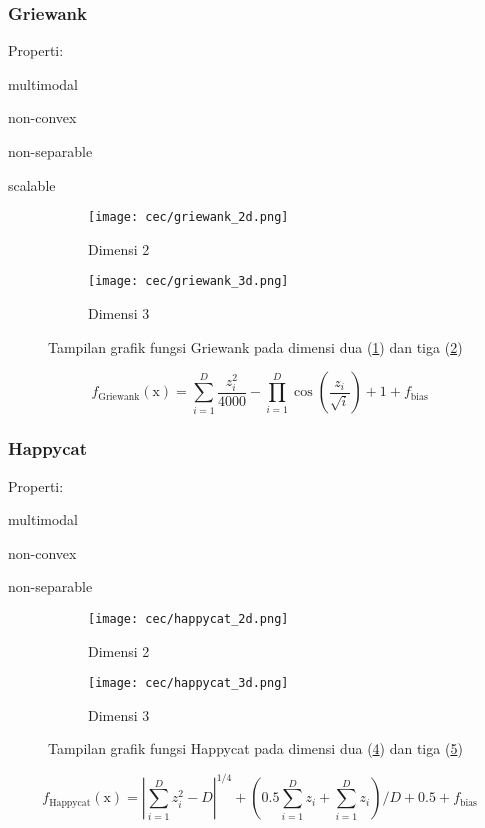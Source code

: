 \subsubsection*{Griewank}
\noindent Properti:
\begin{packed_item}
  \item multimodal
  \item non-convex
  \item non-separable
  \item scalable
\end{packed_item}
\begin{figure}[H]
	\centering
	\begin{subfigure}[b]{0.4\textwidth}
		\centering
		\texttt{[image: cec/griewank\_2d.png]}
		\caption{Dimensi 2}
		\label{fig:griewank-2d}
	\end{subfigure}
	\hfill
	\begin{subfigure}[b]{0.4\textwidth}
		\centering
		\texttt{[image: cec/griewank\_3d.png]}
		\caption{Dimensi 3}
		\label{fig:griewank-3d}
	\end{subfigure}
	\caption{Tampilan grafik fungsi Griewank pada dimensi dua (\cref{fig:griewank-2d}) dan tiga (\cref{fig:griewank-3d})}
	\label{fig:griewank}
\end{figure}
\begin{equation}
  f_{\text{Griewank}}(\mathrm{x})=\sum_{i=1}^{D}\frac{z_i^2}{4000}-\prod_{i=1}^{D}\cos\left( \frac{z_i}{\sqrt{i}}\right)+1 +f_{\text{bias}}
\end{equation}

\subsubsection*{Happycat}
\noindent Properti:
\begin{packed_item}
  \item multimodal
  \item non-convex
  \item non-separable
\end{packed_item}
\begin{figure}[H]
	\centering
	\begin{subfigure}[b]{0.4\textwidth}
		\centering
		\texttt{[image: cec/happycat\_2d.png]}
		\caption{Dimensi 2}
		\label{fig:happycat-2d}
	\end{subfigure}
	\hfill
	\begin{subfigure}[b]{0.4\textwidth}
		\centering
		\texttt{[image: cec/happycat\_3d.png]}
		\caption{Dimensi 3}
		\label{fig:happycat-3d}
	\end{subfigure}
	\caption{Tampilan grafik fungsi Happycat pada dimensi dua (\cref{fig:happycat-2d}) dan tiga (\cref{fig:happycat-3d})}
	\label{fig:happycat}
\end{figure}
\begin{equation}
  f_{\text{Happycat}}(\mathrm{x})=\left|\sum_{i=1}^{D}z_i^2-D \right|^{1/4}+\left(0.5\sum_{i=1}^{D}z_i+\sum_{i=1}^{D}z_i \right)/D+0.5+f_{\text{bias}}
\end{equation}

